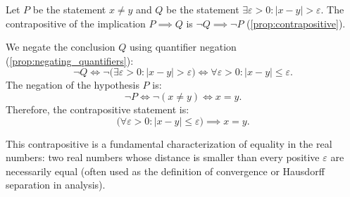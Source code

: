 \begin{exercisesolution*}
\label{sol:logic_contrapositive_reals}
Let $P$ be the statement $x \ne y$ and $Q$ be the statement $\exists \varepsilon > 0 : |x - y| > \varepsilon$.
The contrapositive of the implication $P \implies Q$ is $\neg Q \implies \neg P$ (\cref{prop:contrapositive}).

We negate the conclusion $Q$ using quantifier negation (\cref{prop:negating_quantifiers}):
\[
\neg Q \iff \neg \bigl( \exists \varepsilon > 0 : |x - y| > \varepsilon \bigr) \iff \forall \varepsilon > 0 : |x - y| \le \varepsilon.
\]
The negation of the hypothesis $P$ is:
\[
\neg P \iff \neg(x \ne y) \iff x = y.
\]
Therefore, the contrapositive statement is:
\[
\bigl( \forall \varepsilon > 0 : |x - y| \le \varepsilon \bigr) \implies x = y.
\]
\begin{ainote}
This contrapositive is a fundamental characterization of equality in the real numbers: two real numbers whose distance is smaller than every positive $\varepsilon$ are necessarily equal (often used as the definition of convergence or Hausdorff separation in analysis).
\end{ainote}
\end{exercisesolution*}

